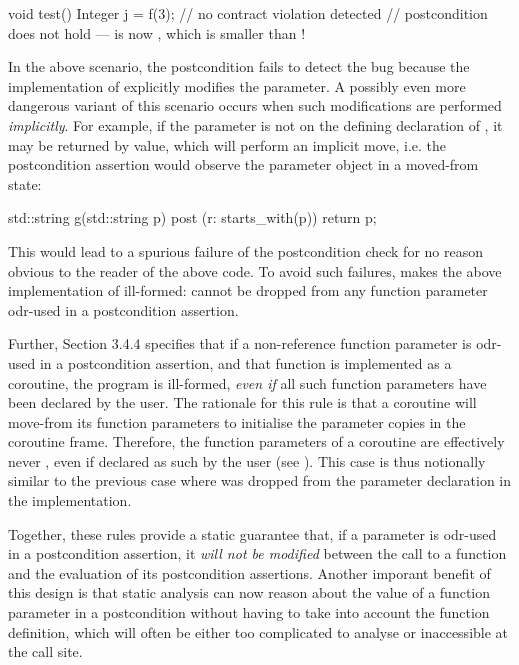 \begin{codeblock}
void test() {
  Integer j = f(3); // no contract violation detected
  // postcondition does not hold ---  is now , which is smaller than !
}
\end{codeblock}
In the above scenario, the postcondition fails to detect the bug because the implementation of  explicitly modifies the parameter. A possibly even more dangerous variant of this scenario occurs when such modifications are performed \emph{implicitly}. For example, if the parameter is not  on the defining declaration of , it may be returned by value, which will perform an implicit move, i.e. the postcondition assertion would observe the parameter object in a moved-from state:
\begin{codeblock}
std::string g(std::string p) post (r: starts_with(p)) {
  return p; 
}
\end{codeblock}
This would lead to a spurious failure of the postcondition check for no reason obvious to the reader of the above code. To avoid such failures, \cite{P2900R10} makes the above implementation of  ill-formed:  cannot be dropped from any function parameter odr-used in a postcondition assertion.

Further, \cite{P2900R10} Section 3.4.4 specifies that if a non-reference function parameter is odr-used in a postcondition assertion, and that function is implemented as a coroutine, the program is ill-formed, \emph{even if} all such function parameters have been declared  by the user. The rationale for this rule is that a coroutine will move-from its function parameters to initialise the parameter copies in the coroutine frame. Therefore, the function parameters of a coroutine are effectively never , even if declared as such by the user (see \cite{P3387R0}). This case is thus notionally similar to the previous case where  was dropped from the parameter declaration in the implementation.

Together, these rules provide a static guarantee that, if a parameter is odr-used in a postcondition assertion, it \emph{will not be modified} between the call to a function and the evaluation of its postcondition assertions. Another imporant benefit of this design is that static analysis can now reason about the value of a function parameter in a postcondition without having to take into account the function definition, which will often be either too complicated to analyse or inaccessible at the call site.


